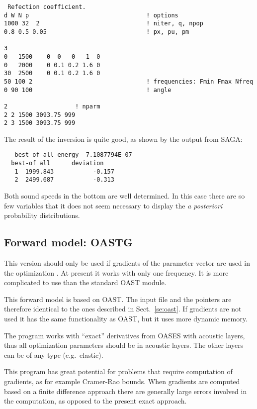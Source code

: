 \documentclass{saclantc}
\begin{document}
\small
\begin{verbatim}
 Refection coefficient.
d W N p                                 ! options
1000 32  2                              ! niter, q, npop
0.8 0.5 0.05                            ! px, pu, pm
       
3
0   1500    0  0   0   1  0
0   2000    0 0.1 0.2 1.6 0
30  2500    0 0.1 0.2 1.6 0
50 100 2                                ! frequencies: Fmin Fmax Nfreq
0 90 100                                ! angle

2 					! nparm 
2 2 1500 3093.75 999
2 3 1500 3093.75 999
\end{verbatim}
\normalsize

The result of the inversion is quite good, as shown by the output from
{\sf SAGA}:

\small
\begin{verbatim}
   best of all energy  7.1087794E-07
  best-of all      deviation  
   1  1999.843           -0.157
   2  2499.687           -0.313
\end{verbatim}
\normalsize

Both sound speeds in the bottom are well determined.
In this case there are so few variables that it does not seem necessary
to display the {\it a posteriori} probability distributions.


\subsection{Forward model: OASTG }
This version should only be used if gradients
 of the parameter vector are used in the
optimization \cite{gerstoft:asa95}.
 {At present it
works with only one frequency}. It is more complicated to use than the
standard {\sf OAST} module. 

This forward model is based on {\sf OAST}. The input file and the
pointers are therefore identical to the ones described in Sect.~\ref{se:oast}.
If gradients are not used it has the same functionality as {\sf OAST},
but it uses  more dynamic memory.

The program works with ``exact''  derivatives from {\sf OASES} with  acoustic layers, thus all 
optimization parameters should be in acoustic layers. The other 
layers can be of any type (e.g.\ elastic).

This program has great potential for problems that require
computation of gradients, as for example Cramer-Rao bounds. 
When gradients are computed based on a finite difference approach
there are generally large errors involved in the computation, as
opposed to the present exact approach. 
\end{document}

